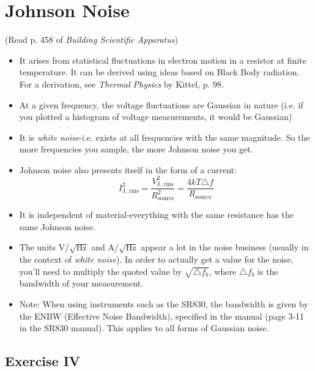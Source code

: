 \documentclass{../lab}
\begin{document}
\section{Johnson Noise}

(Read p. 458 of \emph{Building Scientific Apparatus})

\begin{itemize}
    \item It arises from statistical fluctuations in electron motion in a resistor at finite temperature. It can be derived using ideas based on Black Body radiation. For a derivation, see \emph{Thermal Physics} by Kittel, p. 98.

    \item At a given frequency, the voltage fluctuations are Gaussian in nature (i.e. if you plotted a histogram of voltage measurements, it would be Gaussian)

    \item It is \emph{white noise}-i.e. exists at all frequencies with the same magnitude. So the more frequencies you sample, the more Johnson noise you get.

    \item Johnson noise also presents itself in the form of a current:
    \[
    I_\text{J, rms}^2 = \frac{V_\text{J, rms}^2}{R_\text{source}^2} = \frac{4kT\triangle f}{R_\text{source}}
    \]

    \item It is independent of material-everything with the same resistance has the same Johnson noise.

    \item The units V/$\sqrt{\text{Hz}}$ and A/$\sqrt{\text{Hz}}$ appear a lot in the noise business (usually in the context of \emph{white noise}). In order to actually get a value for the noise, you'll need to multiply the quoted value by $\sqrt{\triangle f_b}$, where $\triangle f_b$ is the bandwidth of your measurement.

    \item Note: When using instruments such as the SR830, the bandwidth is given by the ENBW (Effective Noise Bandwidth), specified in the manual (page 3-11 in the SR830 manual). This applies to all forms of Gaussian noise.

\end{itemize}

\subsection{Exercise IV}
\end{document}
